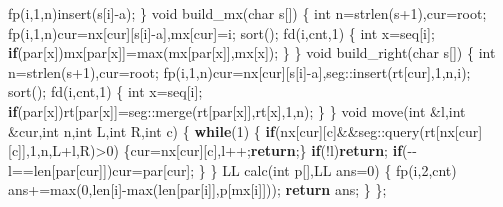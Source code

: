 \documentclass[
]{article}
\newenvironment{Shaded}{}{}
\newcommand{\CharTok}[1]{\textcolor[rgb]{0.25,0.44,0.63}{#1}}
\newcommand{\ControlFlowTok}[1]{\textcolor[rgb]{0.00,0.44,0.13}{\textbf{#1}}}
\newcommand{\DataTypeTok}[1]{\textcolor[rgb]{0.56,0.13,0.00}{#1}}
\newcommand{\DecValTok}[1]{\textcolor[rgb]{0.25,0.63,0.44}{#1}}
\newcommand{\NormalTok}[1]{#1}
\begin{document}
\begin{Shaded}
\begin{Highlighting}[]
\NormalTok{        fp(i,}\DecValTok{1}\NormalTok{,n)insert(s[i]{-}}\CharTok{\textquotesingle{}a\textquotesingle{}}\NormalTok{);}
\NormalTok{    \}}
    \DataTypeTok{void}\NormalTok{ build\_mx(}\DataTypeTok{char}\NormalTok{ s[])}
\NormalTok{    \{}
        \DataTypeTok{int}\NormalTok{ n=strlen(s+}\DecValTok{1}\NormalTok{),cur=root;}
\NormalTok{        fp(i,}\DecValTok{1}\NormalTok{,n)cur=nx[cur][s[i]{-}}\CharTok{\textquotesingle{}a\textquotesingle{}}\NormalTok{],mx[cur]=i;}
\NormalTok{        sort();}
\NormalTok{        fd(i,cnt,}\DecValTok{1}\NormalTok{)}
\NormalTok{        \{}
            \DataTypeTok{int}\NormalTok{ x=seq[i];}
            \ControlFlowTok{if}\NormalTok{(par[x])mx[par[x]]=max(mx[par[x]],mx[x]);}
\NormalTok{        \}}
\NormalTok{    \}}
    \DataTypeTok{void}\NormalTok{ build\_right(}\DataTypeTok{char}\NormalTok{ s[])}
\NormalTok{    \{}
        \DataTypeTok{int}\NormalTok{ n=strlen(s+}\DecValTok{1}\NormalTok{),cur=root;}
\NormalTok{        fp(i,}\DecValTok{1}\NormalTok{,n)cur=nx[cur][s[i]{-}}\CharTok{\textquotesingle{}a\textquotesingle{}}\NormalTok{],seg::insert(rt[cur],}\DecValTok{1}\NormalTok{,n,i);}
\NormalTok{        sort();}
\NormalTok{        fd(i,cnt,}\DecValTok{1}\NormalTok{)}
\NormalTok{        \{}
            \DataTypeTok{int}\NormalTok{ x=seq[i];}
            \ControlFlowTok{if}\NormalTok{(par[x])rt[par[x]]=seg::merge(rt[par[x]],rt[x],}\DecValTok{1}\NormalTok{,n);}
\NormalTok{        \}}
\NormalTok{    \}}
    \DataTypeTok{void}\NormalTok{ move(}\DataTypeTok{int}\NormalTok{ \&l,}\DataTypeTok{int}\NormalTok{ \&cur,}\DataTypeTok{int}\NormalTok{ n,}\DataTypeTok{int}\NormalTok{ L,}\DataTypeTok{int}\NormalTok{ R,}\DataTypeTok{int}\NormalTok{ c)}
\NormalTok{    \{}
        \ControlFlowTok{while}\NormalTok{(}\DecValTok{1}\NormalTok{)}
\NormalTok{        \{}
            \ControlFlowTok{if}\NormalTok{(nx[cur][c]\&\&seg::query(rt[nx[cur][c]],}\DecValTok{1}\NormalTok{,n,L+l,R)\textgreater{}}\DecValTok{0}\NormalTok{)}
\NormalTok{                \{cur=nx[cur][c],l++;}\ControlFlowTok{return}\NormalTok{;\}}
            \ControlFlowTok{if}\NormalTok{(!l)}\ControlFlowTok{return}\NormalTok{;}
            \ControlFlowTok{if}\NormalTok{({-}{-}l==len[par[cur]])cur=par[cur];}
\NormalTok{        \}}
\NormalTok{    \}}
\NormalTok{    LL calc(}\DataTypeTok{int}\NormalTok{ p[],LL ans=}\DecValTok{0}\NormalTok{)}
\NormalTok{    \{}
\NormalTok{        fp(i,}\DecValTok{2}\NormalTok{,cnt)}
\NormalTok{            ans+=max(}\DecValTok{0}\NormalTok{,len[i]{-}max(len[par[i]],p[mx[i]]));}
        \ControlFlowTok{return}\NormalTok{ ans;}
\NormalTok{    \}}
\NormalTok{\};}

\end{Highlighting}
\end{Shaded}
\end{document}
